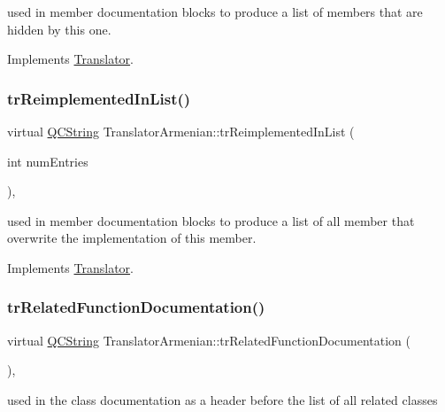 used in member documentation blocks to produce a list of members that are hidden by this one. 

Implements \mbox{\hyperlink{class_translator}{Translator}}.

\mbox{\label{class_translator_armenian_a63a4a642dc2a74c4780ee23d907d7281}} 
\subsubsection{\texorpdfstring{trReimplementedInList()}{trReimplementedInList()}}
{\footnotesize\ttfamily virtual \mbox{\hyperlink{class_q_c_string}{Q\+C\+String}} Translator\+Armenian\+::tr\+Reimplemented\+In\+List (\begin{DoxyParamCaption}\item[{int}]{num\+Entries }\end{DoxyParamCaption})\hspace{0.3cm}{\ttfamily [inline]}, {\ttfamily [virtual]}}

used in member documentation blocks to produce a list of all member that overwrite the implementation of this member. 

Implements \mbox{\hyperlink{class_translator}{Translator}}.

\mbox{\label{class_translator_armenian_ad790a161560ab4f51b6329955173d1d3}} 
\subsubsection{\texorpdfstring{trRelatedFunctionDocumentation()}{trRelatedFunctionDocumentation()}}
{\footnotesize\ttfamily virtual \mbox{\hyperlink{class_q_c_string}{Q\+C\+String}} Translator\+Armenian\+::tr\+Related\+Function\+Documentation (\begin{DoxyParamCaption}{ }\end{DoxyParamCaption})\hspace{0.3cm}{\ttfamily [inline]}, {\ttfamily [virtual]}}

used in the class documentation as a header before the list of all related classes 

